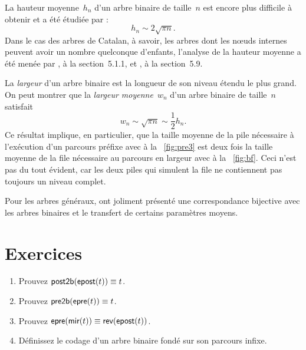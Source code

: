 
La hauteur moyenne~\(h_n\) d'un
arbre binaire de taille~\(n\) est encore plus difficile à obtenir et a
été étudiée par
\cite{FlajoletOdlyzko_1981,BrownShubert_1984,FlajoletOdlyzko_1984,Odlyzko_1984}:
\begin{equation*}
h_n \sim 2 \sqrt{\pi n}.
\end{equation*}
Dans le cas des arbres de Catalan, à savoir, les arbres dont les
nœuds internes peuvent avoir un nombre quelconque d'enfants,
l'analyse de la hauteur moyenne a été menée par
\cite{DasarathyYang_1980,DershowitzZaks_1981}, \cite{Kemp_1984} à la
section~5.1.1, \cite{DershowitzZaks_1990,KnuthdeBruijnRice_2000b} et
\cite{SedgewickFlajolet_1996}, à la
section~5.9.


La \emph{largeur} d'un arbre binaire est
la longueur de son niveau étendu le plus grand. On peut montrer que la \emph{largeur
  moyenne}~\(w_n\) d'un arbre binaire de
taille~\(n\) satisfait
\begin{equation*}
w_n \sim \sqrt{\pi n} \sim \frac{1}{2} h_n.
\end{equation*}
Ce résultat implique, en particulier, que la taille moyenne de la pile
nécessaire à l'exécution d'un parcours préfixe avec
 à la
\fig~\vref{fig:pre3} est deux fois la taille moyenne de la file
nécessaire au parcours en largeur avec 
à la \fig~\vref{fig:bf}. Ceci n'est pas du tout évident, car les deux
piles qui simulent la file ne contiennent pas toujours un niveau
complet.

Pour les arbres généraux, \cite{DasarathyYang_1980} ont joliment
présenté une correspondance bijective avec les arbres binaires et le
transfert de certains paramètres moyens.

\vspace*{-10pt}

\section*{Exercices}

\begin{enumerate}

  \item Prouvez \(\textsf{post2b}(\textsf{epost}(t)) \equiv t\).

  \item Prouvez \(\textsf{pre2b}(\textsf{epre}(t)) \equiv t\).

  \item Prouvez \(\textsf{epre}(\textsf{mir}(t)) \equiv
    \textsf{rev}(\textsf{epost}(t))\).

  \item Définissez le codage d'un arbre binaire fondé sur son parcours
    infixe.

\end{enumerate}
